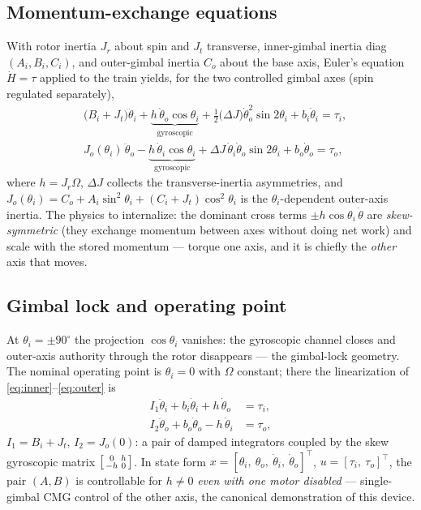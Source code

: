 \documentclass[conference]{IEEEtran}
\begin{document}
\subsection{Momentum-exchange equations}
With rotor inertia $J_r$ about spin and $J_t$ transverse, inner-gimbal inertia diag$(A_i, B_i, C_i)$, and outer-gimbal inertia $C_o$ about the base axis, Euler's equation $\dot H = \tau$ applied to the train yields, for the two controlled gimbal axes (spin regulated separately),
\begin{align}
&\bigl(B_i + J_t\bigr)\ddot\theta_i
+ \underbrace{h\,\dot\theta_o\cos\theta_i}_{\text{gyroscopic}}
+ \tfrac12\bigl(\Delta J\bigr)\dot\theta_o^2\sin2\theta_i
+ b_i\dot\theta_i = \tau_i,
\label{eq:inner}\\[2pt]
&J_o(\theta_i)\,\ddot\theta_o
- \underbrace{h\,\dot\theta_i\cos\theta_i}_{\text{gyroscopic}}
+ \Delta J\,\dot\theta_i\dot\theta_o\sin2\theta_i
+ b_o\dot\theta_o = \tau_o,
\label{eq:outer}
\end{align}
where $h = J_r\Omega$, $\Delta J$ collects the transverse-inertia asymmetries, and
$J_o(\theta_i) = C_o + A_i\sin^2\theta_i + (C_i + J_t)\cos^2\theta_i$ is the $\theta_i$-dependent outer-axis inertia. The physics to internalize: the dominant cross terms $\pm h\cos\theta_i\,\dot\theta$ are \emph{skew-symmetric} (they exchange momentum between axes without doing net work) and scale with the stored momentum --- torque one axis, and it is chiefly the \emph{other} axis that moves.

\subsection{Gimbal lock and operating point}
At $\theta_i = \pm90^\circ$ the projection $\cos\theta_i$ vanishes: the gyroscopic channel closes and outer-axis authority through the rotor disappears --- the gimbal-lock geometry. The nominal operating point is $\theta_i = 0$ with $\Omega$ constant; there the linearization of \eqref{eq:inner}--\eqref{eq:outer} is
\begin{equation}
\begin{aligned}
I_1\ddot\theta_i + b_i\dot\theta_i + h\,\dot\theta_o &= \tau_i,\\
I_2\ddot\theta_o + b_o\dot\theta_o - h\,\dot\theta_i &= \tau_o,
\end{aligned}
\label{eq:gyrolin}
\end{equation}
$I_1 = B_i + J_t$, $I_2 = J_o(0)$: a pair of damped integrators coupled by the skew gyroscopic matrix $\begin{bsmallmatrix}0 & h\\ -h & 0\end{bsmallmatrix}$. In state form $x = [\theta_i,\ \theta_o,\ \dot\theta_i,\ \dot\theta_o]^{\!\top}$, $u = [\tau_i,\ \tau_o]^{\!\top}$, the pair $(A,B)$ is controllable for $h\neq0$ \emph{even with one motor disabled} --- single-gimbal CMG control of the other axis, the canonical demonstration of this device.
\end{document}
